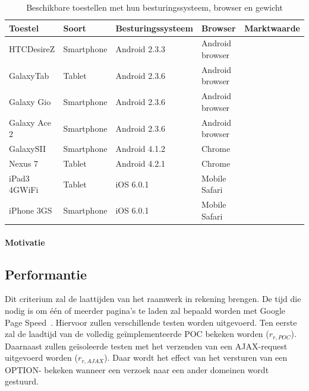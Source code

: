 
\begin{table}[h]
  \centering
  \begin{tabular}{lllll}
    \toprule
    \textbf{Toestel} & \textbf{Soort} &\textbf{Besturingssysteem} & \textbf{Browser} & \textbf{Marktwaarde}\\
    \midrule
    HTCDesireZ & Smartphone & Android 2.3.3 & Android browser & \\
    GalaxyTab & Tablet & Android 2.3.6 & Android browser & \\
    Galaxy Gio & Smartphone & Android 2.3.6 & Android browser & \\
    Galaxy Ace 2 & Smartphone & Android 2.3.6 & Android browser & \\
    GalaxySII & Smartphone  & Android 4.1.2 & Chrome & \\
    Nexus 7 & Tablet & Android 4.2.1  & Chrome & \\
    iPad3 4GWiFi & Tablet & iOS 6.0.1 & Mobile Safari & \\
    iPhone 3GS & Smartphone & iOS 6.0.1 & Mobile Safari & \\
    \bottomrule
  \end{tabular}
  \caption{Beschikbare toestellen met hun besturingssysteem, browser en gewicht}
  \label{tabel:toestellen-hci}
\end{table}


\paragraph{Motivatie}


\subsection{Performantie}
\label{sec:vergelijking-performantie}
Dit criterium zal de laattijden van het raamwerk in rekening brengen.
De tijd die nodig is om één of meerder pagina's te laden zal bepaald worden met Google Page Speed~\cite{Morgan2011}. 
Hiervoor zullen verschillende testen worden uitgevoerd. 
Ten eerste zal de laadtijd van de volledig geïmplementeerde POC bekeken worden ($r_{r,POC}$). 
Daarnaast zullen geïsoleerde testen met het verzenden van een AJAX-request uitgevoerd worden ($r_{r,AJAX}$).
Daar wordt het effect van het versturen van een OPTION- bekeken wanneer een verzoek naar een ander domeinen wordt gestuurd.

